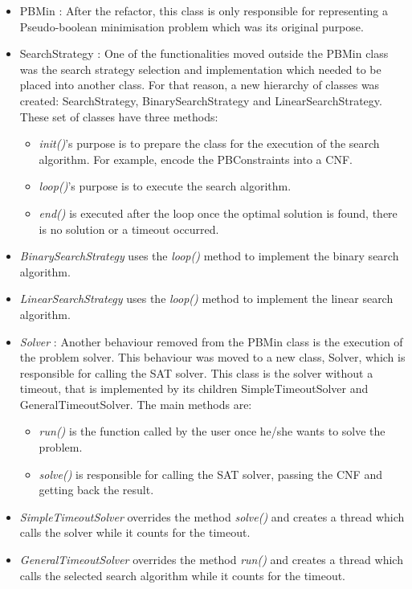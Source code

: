 \begin{itemize}
	\item PBMin : After the refactor, this class is only responsible for representing a Pseudo-boolean minimisation problem which was its original purpose.
	\item SearchStrategy : One of the functionalities moved outside the PBMin class was the search strategy selection and implementation which needed to be placed into another class. For that reason, a new hierarchy of classes was created: SearchStrategy, BinarySearchStrategy and LinearSearchStrategy.  These set of classes have three methods: 
	\begin{itemize}
		\item \emph{init()}'s purpose is to prepare the class for the execution of the search algorithm. For example, encode the PBConstraints   into a CNF. 
		\item \emph{loop()}'s purpose is to execute the search algorithm.  
		\item \emph{end()} is executed after the loop once the optimal solution is found, there is no solution or a timeout occurred. 
	\end{itemize}
	\item \emph{BinarySearchStrategy} uses the \emph{loop()} method to implement the binary search algorithm. 
	\item \emph{LinearSearchStrategy} uses the \emph{loop()} method to implement the linear search algorithm. 
	\item \emph{Solver} : Another behaviour removed from the PBMin class is the execution of the problem solver. This behaviour was moved to a new class, Solver, which is responsible for calling the SAT solver. This class is the solver without a timeout, that is implemented by its children SimpleTimeoutSolver and GeneralTimeoutSolver. The main methods are: 
	\begin{itemize}
		\item \emph{run()} is the function called by the user once he/she wants to solve the problem.
		\item \emph{solve()} is responsible for calling the SAT solver, passing the CNF and getting back the result. 
	\end{itemize}
	\item \emph{SimpleTimeoutSolver} overrides the method \emph{solve()} and creates a thread which calls the solver while it counts for the timeout.  
	\item \emph{GeneralTimeoutSolver} overrides the method \emph{run()} and creates a thread which calls the selected search algorithm while it counts for the timeout. 
\end{itemize}  


